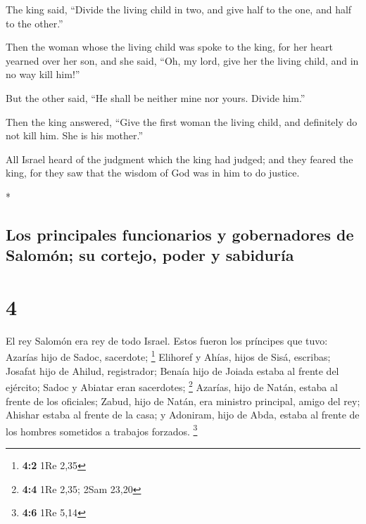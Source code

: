 \begin{paracol}{2}
\begin{otherlanguage}{english}
 The king said, ``Divide the living child in two, and
give half to the one, and half to the other.''

 Then the woman whose the living child was spoke to the
king, for her heart yearned over her son, and she said, ``Oh, my lord,
give her the living child, and in no way kill him!''

But the other said, ``He shall be neither mine nor yours. Divide him.''

 Then the king answered, ``Give the first woman the
living child, and definitely do not kill him. She is his mother.''

 All Israel heard of the judgment which the king had
judged; and they feared the king, for they saw that the wisdom of God
was in him to do justice.

\end{otherlanguage}

\switchcolumn[0]*

\hypertarget{los-principales-funcionarios-y-gobernadores-de-salomuxf3n-su-cortejo-poder-y-sabiduruxeda}{%
\subsection{Los principales funcionarios y gobernadores de Salomón; su
cortejo, poder y
sabiduría}\label{los-principales-funcionarios-y-gobernadores-de-salomuxf3n-su-cortejo-poder-y-sabiduruxeda}}

\hypertarget{section-6}{%
\section{4}\label{section-6}}

 El rey Salomón era rey de todo Israel. 
Estos fueron los príncipes que tuvo: Azarías hijo de Sadoc, sacerdote;
\footnote{\textbf{4:2} 1Re 2,35}  Elihoref y Ahías, hijos
de Sisá, escribas; Josafat hijo de Ahilud, registrador; 
Benaía hijo de Joiada estaba al frente del ejército; Sadoc y Abiatar
eran sacerdotes; \footnote{\textbf{4:4} 1Re 2,35; 2Sam 23,20}
 Azarías, hijo de Natán, estaba al frente de los
oficiales; Zabud, hijo de Natán, era ministro principal, amigo del rey;
 Ahishar estaba al frente de la casa; y Adoniram, hijo de
Abda, estaba al frente de los hombres sometidos a trabajos forzados.
\footnote{\textbf{4:6} 1Re 5,14}


\end{paracol}
